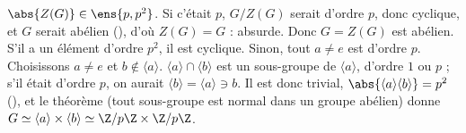 \begin{preuve}
$\abs{Z(G)}\in\ens{p,p^2}$. Si c'était $p$, $G/Z(G)$ serait d'ordre $p$, donc cyclique, et $G$ serait abélien (), d'où $Z(G)=G$ : absurde. Donc $G=Z(G)$ est abélien. S'il a un élément d'ordre $p^2$, il est cyclique. Sinon, tout $a\neq e$ est d'ordre $p$. Choisissons $a\neq e$ et $b\notin\langle a\rangle$. $\langle a\rangle\cap\langle b\rangle$ est un sous-groupe de $\langle a\rangle$, d'ordre $1$ ou $p$ ; s'il était d'ordre $p$, on aurait $\langle b\rangle=\langle a\rangle\ni b$. Il est donc trivial, $\abs{\langle a\rangle\langle b\rangle}=p^2$ (), et le théorème  (tout sous-groupe est normal dans un groupe abélien) donne $G\simeq\langle a\rangle\times\langle b\rangle\simeq\Z/p\Z\times\Z/p\Z$.
\end{preuve}

